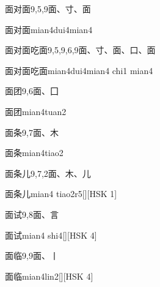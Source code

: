 \begin{entry}{面对面}{9,5,9}{⾯、⼨、⾯}
  \begin{phonetics}{面对面}{mian4dui4mian4}
  \end{phonetics}
\end{entry}

\begin{entry}{面对面吃面}{9,5,9,6,9}{⾯、⼨、⾯、⼝、⾯}
  \begin{phonetics}{面对面吃面}{mian4dui4mian4 chi1 mian4}
  \end{phonetics}
\end{entry}

\begin{entry}{面团}{9,6}{⾯、⼞}
  \begin{phonetics}{面团}{mian4tuan2}
  \end{phonetics}
\end{entry}

\begin{entry}{面条}{9,7}{⾯、⽊}
  \begin{phonetics}{面条}{mian4tiao2}
  \end{phonetics}
\end{entry}

\begin{entry}{面条儿}{9,7,2}{⾯、⽊、⼉}
  \begin{phonetics}{面条儿}{mian4 tiao2r5}[][HSK 1]
  \end{phonetics}
\end{entry}

\begin{entry}{面试}{9,8}{⾯、⾔}
  \begin{phonetics}{面试}{mian4 shi4}[][HSK 4]
  \end{phonetics}
\end{entry}

\begin{entry}{面临}{9,9}{⾯、⼁}
  \begin{phonetics}{面临}{mian4lin2}[][HSK 4]
  \end{phonetics}
\end{entry}


